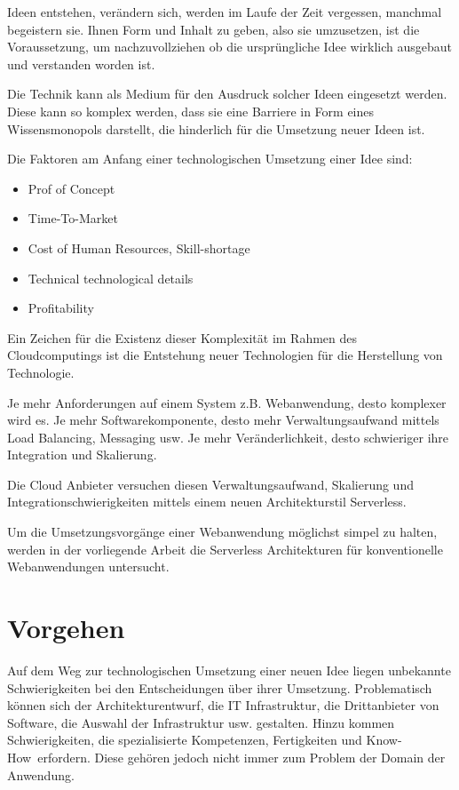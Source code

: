 \documentclass[
12pt,
english,
ngerman,
headsepline,
twoside,
openright,
numbers=noenddot,version=first
]{scrreprt}
\begin{document}
Ideen entstehen, verändern sich, werden im Laufe der Zeit vergessen, manchmal begeistern sie. Ihnen Form und Inhalt zu geben, also sie umzusetzen, ist die Voraussetzung, um nachzuvollziehen ob die ursprüngliche Idee wirklich ausgebaut und verstanden worden ist.

Die Technik kann als Medium für den Ausdruck solcher Ideen eingesetzt werden. Diese kann so komplex werden, dass sie eine Barriere in Form eines Wissensmonopols darstellt, die hinderlich für die Umsetzung neuer Ideen ist.

Die Faktoren am Anfang einer technologischen Umsetzung einer Idee sind:
\begin{itemize}
	\item Prof of Concept\label{aspect:proofConcept}
	\item Time-To-Market\label{aspect:timeToMarket}
	\item Cost of Human Resources, Skill-shortage\label{aspect:costHumanResources}
	\item Technical technological details\label{aspect:techDetails}
	\item Profitability\label{aspect:profit}
\end{itemize}

Ein Zeichen für die Existenz dieser Komplexität im Rahmen des Cloudcomputings ist die Entstehung neuer Technologien für die Herstellung von Technologie. 

Je mehr Anforderungen auf einem System z.B. Webanwendung, desto komplexer wird es. Je mehr Softwarekomponente, desto mehr Verwaltungsaufwand mittels Load Balancing, Messaging usw. Je mehr Veränderlichkeit, desto schwieriger ihre Integration und Skalierung.\cite{patternIntegrationEnterprise} 


Die Cloud Anbieter versuchen diesen Verwaltungsaufwand, Skalierung und Integrationschwierigkeiten mittels einem neuen Architekturstil Serverless.

Um die Umsetzungsvorgänge einer Webanwendung möglichst simpel zu halten, werden in der vorliegende Arbeit die Serverless Architekturen für konventionelle Webanwendungen untersucht.


\section{Vorgehen}
Auf dem Weg zur technologischen Umsetzung einer neuen Idee liegen unbekannte Schwierigkeiten
bei den Entscheidungen über ihrer Umsetzung. Problematisch können sich der Architekturentwurf, die IT Infrastruktur, die Drittanbieter von Software, die Auswahl der Infrastruktur usw. gestalten. Hinzu kommen Schwierigkeiten, die spezialisierte Kompetenzen, Fertigkeiten und \glqq Know-How\grqq\ erfordern. Diese gehören jedoch nicht immer zum Problem der Domain der Anwendung.
\end{document}
